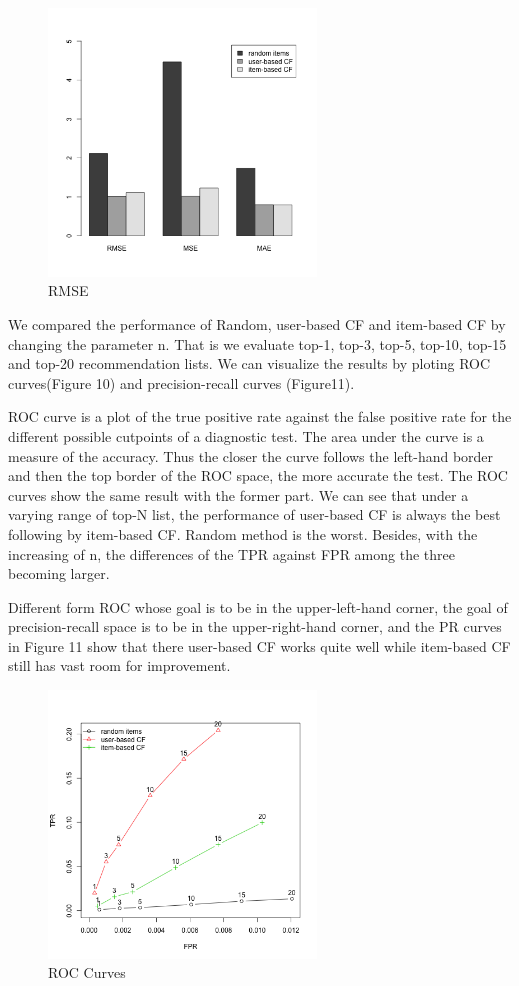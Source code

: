 \documentclass[conference]{IEEEtran}
\begin{document}
\begin{figure}
	\centering
	\includegraphics[width=2.8in]{RMSE.png}
	\caption{RMSE}
	\label{fig:side:a}
\end{figure}

We compared the performance of Random, user-based CF and item-based CF by changing the parameter n. That is we evaluate top-1, top-3, top-5, top-10, top-15 and top-20 recommendation lists. We can visualize the results by ploting ROC curves(Figure 10) and precision-recall curves (Figure11). 

ROC curve is a plot of the true positive rate against the false positive rate for the different possible cutpoints of a diagnostic test. The area under the curve is a measure of the accuracy. Thus the closer the curve follows the left-hand border and then the top border of the ROC space, the more accurate the test. The ROC curves show the same result with the former part. We can see that under a varying range of top-N list, the performance of user-based CF is always the best following by item-based CF. Random method is the worst. Besides, with the increasing of n, the differences of the TPR against FPR among the three becoming larger.

Different form ROC whose goal is to be in the upper-left-hand corner, the goal of precision-recall space is to be in the upper-right-hand corner, and the PR curves in Figure 11 show that there user-based CF works quite well while item-based CF still has vast room for improvement.

\begin{figure}
	\centering
	\includegraphics[width=2.8in]{ROC.png}
	\caption{ROC Curves}
	\label{fig:side:a}
\end{figure}
\end{document}
